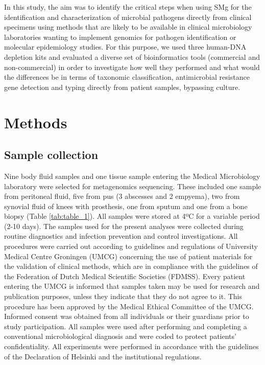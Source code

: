 In this study, the aim was to identify the critical steps when using SMg for the identification and characterization of microbial pathogens directly from clinical specimens using methods that are likely to be available in clinical microbiology laboratories wanting to implement genomics for pathogen identification or molecular epidemiology studies. 
For this purpose, we used three human-DNA depletion kits and evaluated a diverse set of bioinformatics tools (commercial and non-commercial) in order to investigate how well they performed and what would the differences be in terms of taxonomic classification, antimicrobial resistance gene detection and typing directly from patient samples, bypassing culture. 

\section{Methods} \label{sec:methods}

\subsection{Sample collection} \label{ssec:sample_collection}

Nine body fluid samples and one tissue sample entering the Medical Microbiology laboratory were selected for metagenomics sequencing. 
These included one sample from peritoneal fluid, five from pus (3 abscesses and 2 empyema), two from synovial fluid of knees with prosthesis, one from sputum and one from a bone biopsy (Table \ref{tab:table_1}). 
All samples were stored at 4ºC for a variable period (2-10 days). 
The samples used for the present analyses were collected during routine diagnostics and infection prevention and control investigations. 
All procedures were carried out according to guidelines and regulations of University Medical Centre Groningen (UMCG) concerning the use of patient materials for the validation of clinical methods, which are in compliance with the guidelines of the Federation of Dutch Medical Scientific Societies (FDMSS).
Every patient entering the UMCG is informed that samples taken may be used for research and publication purposes, unless they indicate that they do not agree to it. 
This procedure has been approved by the Medical Ethical Committee of the UMCG. 
Informed consent was obtained from all individuals or their guardians prior to study participation. 
All samples were used after performing and completing a conventional microbiological diagnosis and were coded to protect patients’ confidentiality. 
All experiments were performed in accordance with the guidelines of the Declaration of Helsinki and the institutional regulations. 

